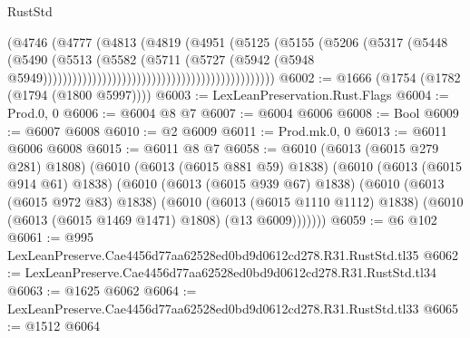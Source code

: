 \begin{lexlean}{RustStd}
\begin{coremodule}
                                                                (@4746
                                                                  (@4777
                                                                    (@4813
                                                                      (@4819
                                                                        (@4951
                                                                          (@5125
                                                                            (@5155
                                                                              (@5206
                                                                                (@5317
                                                                                  (@5448
                                                                                    (@5490
                                                                                      (@5513
                                                                                        (@5582
                                                                                          (@5711
                                                                                            (@5727
                                                                                              (@5942
                                                                                                (@5948
                                                                                                  @5949)))))))))))))))))))))))))))))))))))))))))))))))
@6002 := @1666 (@1754 (@1782 (@1794 (@1800 @5997))))
@6003 := LexLeanPreservation.Rust.Flags
@6004 := Prod.{0, 0}
@6006 := @6004 @8 @7
@6007 := @6004 @6006
@6008 := Bool
@6009 := @6007 @6008
@6010 := @2 @6009
@6011 := Prod.mk.{0, 0}
@6013 := @6011 @6006 @6008
@6015 := @6011 @8 @7
@6058 := @6010
    (@6013 (@6015 @279 @281) @1808)
    (@6010
      (@6013 (@6015 @881 @59) @1838)
      (@6010
        (@6013 (@6015 @914 @61) @1838)
        (@6010
          (@6013 (@6015 @939 @67) @1838)
          (@6010
            (@6013 (@6015 @972 @83) @1838)
            (@6010
              (@6013 (@6015 @1110 @1112) @1838)
              (@6010 (@6013 (@6015 @1469 @1471) @1808) (@13 @6009)))))))
@6059 := @6 @102
@6061 := @995 LexLeanPreserve.Cae4456d77aa62528ed0bd9d0612cd278.R31.RustStd.tl35
@6062 := LexLeanPreserve.Cae4456d77aa62528ed0bd9d0612cd278.R31.RustStd.tl34
@6063 := @1625 @6062
@6064 := LexLeanPreserve.Cae4456d77aa62528ed0bd9d0612cd278.R31.RustStd.tl33
@6065 := @1512 @6064

\end{coremodule}
\end{lexlean}
